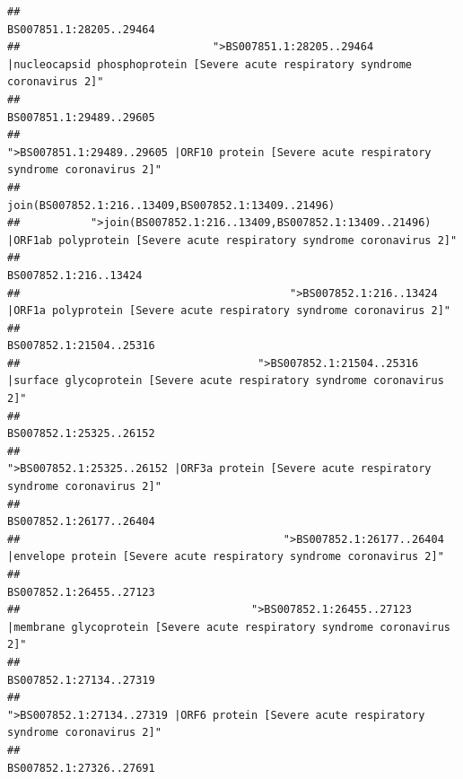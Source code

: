 \documentclass[
]{article}
\begin{document}
\begin{verbatim}
##                                                                                                                BS007851.1:28205..29464 
##                              ">BS007851.1:28205..29464 |nucleocapsid phosphoprotein [Severe acute respiratory syndrome coronavirus 2]" 
##                                                                                                                BS007851.1:29489..29605 
##                                            ">BS007851.1:29489..29605 |ORF10 protein [Severe acute respiratory syndrome coronavirus 2]" 
##                                                                                    join(BS007852.1:216..13409,BS007852.1:13409..21496) 
##           ">join(BS007852.1:216..13409,BS007852.1:13409..21496) |ORF1ab polyprotein [Severe acute respiratory syndrome coronavirus 2]" 
##                                                                                                                  BS007852.1:216..13424 
##                                          ">BS007852.1:216..13424 |ORF1a polyprotein [Severe acute respiratory syndrome coronavirus 2]" 
##                                                                                                                BS007852.1:21504..25316 
##                                     ">BS007852.1:21504..25316 |surface glycoprotein [Severe acute respiratory syndrome coronavirus 2]" 
##                                                                                                                BS007852.1:25325..26152 
##                                            ">BS007852.1:25325..26152 |ORF3a protein [Severe acute respiratory syndrome coronavirus 2]" 
##                                                                                                                BS007852.1:26177..26404 
##                                         ">BS007852.1:26177..26404 |envelope protein [Severe acute respiratory syndrome coronavirus 2]" 
##                                                                                                                BS007852.1:26455..27123 
##                                    ">BS007852.1:26455..27123 |membrane glycoprotein [Severe acute respiratory syndrome coronavirus 2]" 
##                                                                                                                BS007852.1:27134..27319 
##                                             ">BS007852.1:27134..27319 |ORF6 protein [Severe acute respiratory syndrome coronavirus 2]" 
##                                                                                                                BS007852.1:27326..27691 

\end{verbatim}
\end{document}
